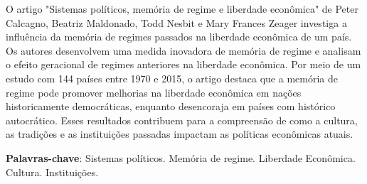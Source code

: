 
\setlength{\absparsep}{18pt} %
\begin{resumo}
    O artigo "Sistemas políticos, memória de regime e liberdade econômica" de Peter Calcagno, Beatriz Maldonado, Todd Nesbit e Mary Frances Zeager investiga a influência da memória de regimes passados na liberdade econômica de um país. Os autores desenvolvem uma medida inovadora de memória de regime e analisam o efeito geracional de regimes anteriores na liberdade econômica. Por meio de um estudo com 144 países entre 1970 e 2015, o artigo destaca que a memória de regime pode promover melhorias na liberdade econômica em nações historicamente democráticas, enquanto desencoraja em países com histórico autocrático. Esses resultados contribuem para a compreensão de como a cultura, as tradições e as instituições passadas impactam as políticas econômicas atuais.

 \textbf{Palavras-chave}: Sistemas políticos. Memória de regime. Liberdade Econômica. Cultura. Instituições.
\end{resumo}
